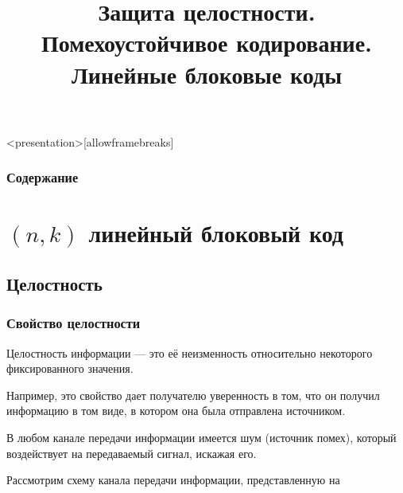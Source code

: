 
\title[Помехоустойчивое кодирование]{Защита целостности. Помехоустойчивое кодирование. Линейные блоковые коды}






\begin{frame}<presentation>[allowframebreaks]
    \frametitle{Содержание}
    \tableofcontents
\end{frame}


\section{$(n,k)$ линейный блоковый код}


\subsection{Целостность}


\begin{frame}
    \frametitle{Свойство целостности}
    
    \begin{definition}
        \alert{Целостность} информации --- это её неизменность относительно некоторого фиксированного значения.
    \end{definition}
    Например, это свойство дает \alert{получателю} уверенность в том, что он получил информацию в том виде, 
    в котором она была отправлена \alert{источником}. 
    
    В любом канале передачи информации имеется \alert{шум} (источник \alert{помех}), который воздействует 
    на передаваемый \alert{сигнал}, искажая его. 
    
\end{frame}


Рассмотрим схему канала передачи информации, представленную на



